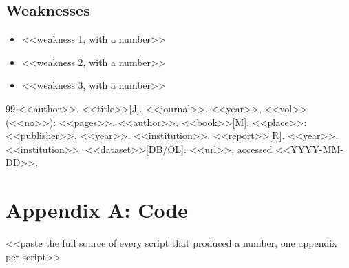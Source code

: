 \documentclass[<<options>>]{apmcmthesis}
\begin{document}
\subsection{Weaknesses}
\begin{itemize}
  \item <<weakness 1, with a number>>
  \item <<weakness 2, with a number>>
  \item <<weakness 3, with a number>>
\end{itemize}

\begin{thebibliography}{99}
 <<author>>. <<title>>[J]. <<journal>>, <<year>>, <<vol>>(<<no>>): <<pages>>.
 <<author>>. <<book>>[M]. <<place>>: <<publisher>>, <<year>>.
 <<institution>>. <<report>>[R]. <<year>>.
 <<institution>>. <<dataset>>[DB/OL]. <<url>>, accessed <<YYYY-MM-DD>>.
\end{thebibliography}

\appendix
\section{Appendix A: Code}
%
<<paste the full source of every script that produced a number, one appendix per script>>
\end{document}
